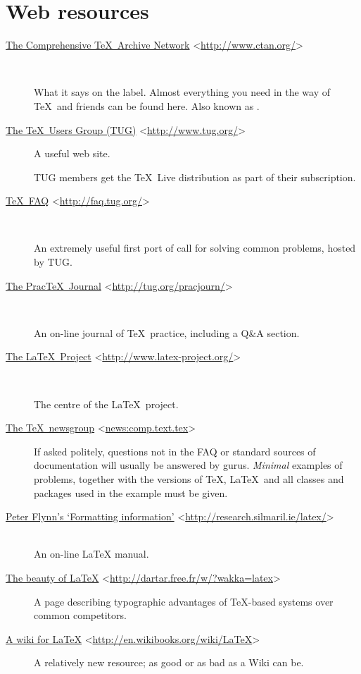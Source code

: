\documentclass[authoryearcitations]{UoYCSproject}
\begin{document}
\section{Web resources}
\label{sec:webresources}

\newcommand{\wwwr}[2]{\item[\href{#1}{#2} \textless\url{#1}\textgreater]}
\begin{description}
  \wwwr{http://www.ctan.org/}{The Comprehensive \TeX\ Archive Network}\
  
  What it says on the label.  Almost everything you need in the way of
  \TeX\ and friends can be found here.  Also known as \CTAN.

\wwwr{http://www.tug.org/}{The \TeX\ Users Group (TUG)} A useful web
  site.
  
  TUG members get the \TeX~Live distribution as part of their
  subscription.

\wwwr{http://faq.tug.org/}{\TeX~FAQ}\

  An extremely useful first port of call for solving common problems,
  hosted by TUG.

\wwwr{http://tug.org/pracjourn/}{The Prac\TeX\ Journal}\

  An on-line journal of \TeX\ practice, including a Q\&A section.

\wwwr{http://www.latex-project.org/}{The \LaTeX\ Project}\

  The centre of the \LaTeX\ project.
  
\wwwr{news:comp.text.tex}{The \TeX\ newsgroup}
  
  If asked politely, questions not in the FAQ or standard sources of
  documentation will usually be answered by gurus.  \emph{Minimal}
  examples of problems, together with the versions of \TeX, \LaTeX\ 
  and all classes and packages used in the example must be given.

\wwwr{http://research.silmaril.ie/latex/}{Peter Flynn's `Formatting
  information'}

  \ \\An on-line \LaTeX{} manual.

\wwwr{http://dartar.free.fr/w/?wakka=latex}{The beauty of \LaTeX{}}

  A page describing typographic advantages of \TeX-based systems over
  common competitors.

\wwwr{http://en.wikibooks.org/wiki/LaTeX}{A wiki for \LaTeX{}}

  A relatively new resource; as good or as bad as a Wiki can be.


\end{description}
\end{document}
